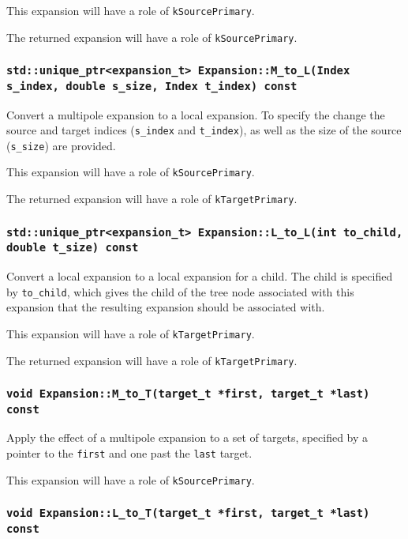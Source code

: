 This expansion will have a role of \texttt{kSourcePrimary}.

The returned expansion will have a role of \texttt{kSourcePrimary}.


\subsubsection{\texttt{std::unique\_ptr<expansion\_t> Expansion::M\_to\_L(Index s\_index, double s\_size, Index t\_index) const}}

Convert a multipole expansion to a local expansion. To specify the change the
source and target indices (\texttt{s\_index} and \texttt{t\_index}), as well
as the size of the source (\texttt{s\_size}) are provided.

This expansion will have a role of \texttt{kSourcePrimary}.

The returned expansion will have a role of \texttt{kTargetPrimary}.

\subsubsection{\texttt{std::unique\_ptr<expansion\_t> Expansion::L\_to\_L(int to\_child, double t\_size) const}}

Convert a local expansion to a local expansion for a child. The child is
specified by \texttt{to\_child}, which gives the child of the tree node
associated with this expansion that the resulting expansion should be
associated with.

This expansion will have a role of \texttt{kTargetPrimary}.

The returned expansion will have a role of \texttt{kTargetPrimary}.

\subsubsection{\texttt{void Expansion::M\_to\_T(target\_t *first, target\_t *last) const}}

Apply the effect of a multipole expansion to a set of targets, specified by
a pointer to the \texttt{first} and one past the \texttt{last} target.

This expansion will have a role of \texttt{kSourcePrimary}.

\subsubsection{\texttt{void Expansion::L\_to\_T(target\_t *first, target\_t *last) const}}

